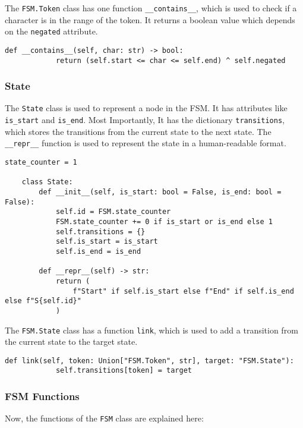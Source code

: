 \documentclass[12pt]{report}
\begin{document}
The \texttt{FSM.Token} class has one function \texttt{\_\_contains\_\_}, which is used to check if a character is in the range of the token. It returns a boolean value which depends on the \texttt{negated} attribute.

\begin{lstlisting}[caption={\texttt{FSM.Token.\_\_contains\_\_}}]
        def __contains__(self, char: str) -> bool:
            return (self.start <= char <= self.end) ^ self.negated
\end{lstlisting}

\subsubsection{State}

The \texttt{State} class is used to represent a node in the FSM. It has attributes like \texttt{is\_start} and \texttt{is\_end}. Most Importantly, It has the dictionary \texttt{transitions}, which stores the transitions from the current state to the next state. The \texttt{\_\_repr\_\_} function is used to represent the state in a human-readable format.

\begin{lstlisting}[caption={\texttt{FSM.State}}]
    state_counter = 1

    class State:
        def __init__(self, is_start: bool = False, is_end: bool = False):
            self.id = FSM.state_counter
            FSM.state_counter += 0 if is_start or is_end else 1
            self.transitions = {}
            self.is_start = is_start
            self.is_end = is_end

        def __repr__(self) -> str:
            return (
                f"Start" if self.is_start else f"End" if self.is_end else f"S{self.id}"
            )
\end{lstlisting}

The \texttt{FSM.State} class has a function \texttt{link}, which is used to add a transition from the current state to the target state.

\begin{lstlisting}[caption={\texttt{FSM.State.link}}]
        def link(self, token: Union["FSM.Token", str], target: "FSM.State"):
            self.transitions[token] = target
\end{lstlisting}

\subsubsection{FSM Functions}
Now, the functions of the \texttt{FSM} class are explained here:
\end{document}
